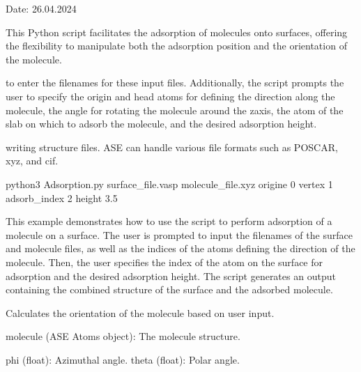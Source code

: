 \documentclass[letterpaper,10pt,english]{sphinxmanual}
\begin{document}
\sphinxAtStartPar
Date: 26.04.2024
\begin{description}
\sphinxAtStartPar
This Python script facilitates the adsorption of molecules onto surfaces, offering the flexibility to
manipulate both the adsorption position and the orientation of the molecule.

\sphinxAtStartPar
to enter the filenames for these input files. Additionally, the script prompts the user to 
specify the origin and head atoms for defining the direction along the molecule, the angle 
for rotating the molecule around the z\sphinxhyphen{}axis, the atom of the slab on which to adsorb the 
molecule, and the desired adsorption height.

\sphinxAtStartPar
writing structure files. ASE can handle various file formats such as POSCAR, xyz, and cif.

\sphinxAtStartPar
python3 Adsorption.py surface\_file.vasp molecule\_file.xyz \textendash{}origine 0 \textendash{}vertex 1 \textendash{}adsorb\_index 2 \textendash{}height 3.5

\sphinxAtStartPar
This example demonstrates how to use the script to perform adsorption of a molecule on a surface. 
The user is prompted to input the filenames of the surface and molecule files, as well as the indices 
of the atoms defining the direction of the molecule. Then, the user specifies the index of the atom on 
the surface for adsorption and the desired adsorption height. The script generates an output containing 
the combined structure of the surface and the adsorbed molecule.

\end{description}

\begin{fulllineitems}
\label{\detokenize{module_documentation:Adsorption.calculate_molecule_orientation}}
\pysigstartsignatures
{}
\pysigstopsignatures
\sphinxAtStartPar
Calculates the orientation of the molecule based on user input.
\begin{description}
\sphinxAtStartPar
molecule (ASE Atoms object): The molecule structure.

\sphinxAtStartPar
phi (float): Azimuthal angle.
theta (float): Polar angle.

\end{description}

\end{fulllineitems}
\end{document}
